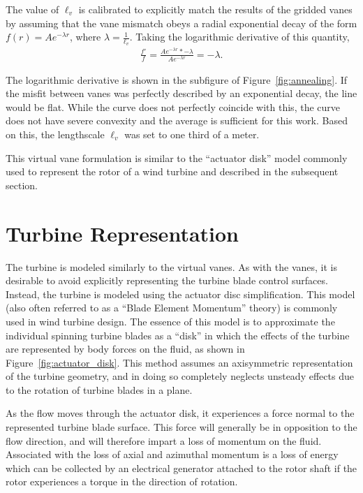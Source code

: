 The value of $\ell_v$ is calibrated to explicitly match the 
results of the gridded vanes by assuming that the vane mismatch 
obeys a radial exponential decay of the form $f(r) = A e^{-\lambda r}$, 
where $\lambda = \frac{1}{\ell_v}$.
Taking the logarithmic derivative of this quantity, 
\begin{eqnarray}
 \frac{f'}{f} = \frac{A e^{-\lambda r} * -\lambda}{A e^{-\lambda r}} =
  -\lambda. 
\end{eqnarray}

The logarithmic derivative is shown in the 
subfigure of Figure~\ref{fig:annealing}. If the misfit between vanes 
was perfectly described by an exponential decay, the line would be flat. 
While the curve does not perfectly coincide with this, the curve does
not have severe convexity and the average is sufficient for this
work. Based on this, the lengthscale $\ell_v$ was set to one third of a
meter. 


This virtual vane formulation is similar to the ``actuator disk'' model
commonly used to represent the rotor of a wind turbine and
described in the subsequent section. 

\section{Turbine Representation}
\label{sec:actuator_disk}
%
%

The turbine is modeled similarly to the virtual vanes. As with the
vanes, it is desirable to avoid explicitly representing the turbine
blade control surfaces. Instead, the turbine is modeled using the
actuator disc simplification. 
This model (also often referred to as a ``Blade Element Momentum''
theory) is commonly used in wind
turbine design\cite{shevell1983fundamentals,betz,leclerc}. The essence
of this model is to approximate the individual spinning turbine blades
as a ``disk'' in which the effects of the turbine are represented by
body forces on the fluid, as shown in Figure~\ref{fig:actuator_disk}.
This method assumes an axisymmetric representation of the turbine
geometry, and in doing so completely neglects unsteady effects due to
the rotation of turbine blades in a plane. 

As the flow moves through the actuator disk, it experiences a force
normal to the represented turbine blade surface. This force will
generally be in opposition to the flow direction, and will therefore
impart a loss of momentum on the fluid. 
Associated with the loss of axial and azimuthal momentum is a loss of
energy which can be collected by an electrical generator attached
to the rotor shaft if the rotor experiences a torque
in the direction of rotation. 

